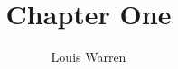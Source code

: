 \documentclass[a4paper]{article}
\begin{document}
\title{Chapter One}
\author{Louis Warren}
\maketitle

\tableofcontents



\end{document}
